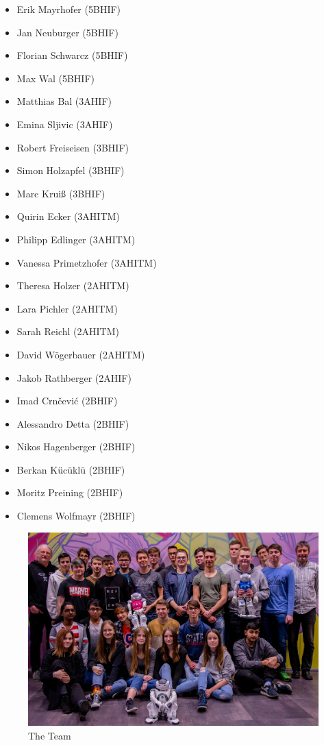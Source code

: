 \documentclass[11pt]{article}
\begin{document}
\begin{multicols}{2}
\begin{itemize}
	\item Erik Mayrhofer (5BHIF)
	\item Jan Neuburger (5BHIF)
	\item Florian Schwarcz (5BHIF)
	\item Max Wal (5BHIF)
	\item Matthias Bal (3AHIF)
	\item Emina Sljivic (3AHIF)
	\item Robert Freiseisen (3BHIF)
	\item Simon Holzapfel (3BHIF)
	\item Marc Kruiß (3BHIF)
	\item Quirin Ecker (3AHITM)
	\item Philipp Edlinger (3AHITM)
	\item Vanessa Primetzhofer (3AHITM)
	\item Theresa Holzer (2AHITM)
	\item Lara Pichler (2AHITM)
	\item Sarah Reichl (2AHITM)
	\item David Wögerbauer (2AHITM)
	\item Jakob Rathberger (2AHIF)
	\item Imad Crnčević (2BHIF)
	\item Alessandro Detta (2BHIF)
	\item Nikos Hagenberger (2BHIF)
	\item Berkan Kücüklü (2BHIF)
	\item Moritz Preining (2BHIF)
	\item Clemens Wolfmayr (2BHIF)
\end{itemize}
\end{multicols}

\begin{figure}
\begin{center}
\includegraphics[scale=0.65]{img/whole-team.jpg}
\end{center}
\caption{The Team}
\label{fig:team}
\end{figure}
\end{document}
